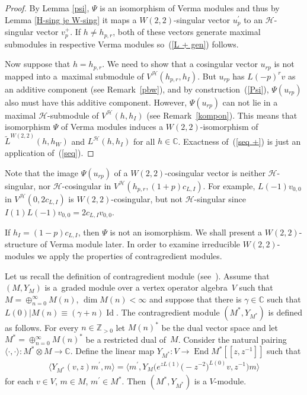 \documentclass[11pt]{article}
\numberwithin{equation}{section}
\newcommand{\N}{{\mathbb Z}_{> 0} }
\newcommand{\C}{\mathbb C}
\newcommand{\HVir}{\mathcal H}
\begin{document}
\begin{proof}
By Lemma \ref{psi}, $\Psi$ is an isomorphism of Verma modules and thus by Lemma \ref{H-sing je W-sing} it maps a $W(2,2) $-singular vector $u^{\prime}_p$ to an $\HVir$-singular vector $v_p^+$. If $h\neq h_{p,r}$, both of these vectors generate maximal submodules in respective Verma modules so~(\ref{L + gen}) follows.

Now suppose that $h=h_{p,r}$. We need to show that a cosingular vector $u_{rp}$ is not mapped into a~maximal submodule of $V^\HVir(h_{p,r},h_I)$. But $u_{rp}$ has $L(-p) ^{r}v$ as an additive component (see Remark~\ref{pbw}), and by construction~(\ref{Psi}), $\Psi(u_{rp})$ also must have this additive component. However, $\Psi(u_{rp})$ can not lie in a maximal $\HVir$-submodule of $V^{\HVir}(h,h_{I}) $ (see Remark~\ref{kompon}). This means that isomorphism $\Psi$ of Verma modules induces a $W(2,2) $-isomorphism of $\widetilde{L}^{W(2,2)}(h,h_{W}) $ and $L^{\HVir}(h,h_{I}) $ for all $h\in\C$. Exactness of~(\ref{seq +}) is just an application of~(\ref{seq}).
\end{proof}

\begin{Remark}
Note that the image $\Psi(u_{rp}) $ of a $W(2,2)$-cosingular vector is neither $\HVir$-singular, nor $\HVir$-cosingular in $V^{\HVir}(h_{p,r},(1+p)c_{L,I})$. For example, $L(-1) v_{0,0}$ in $V^{\HVir}(0,2c_{L,I})$ is $W(2,2)$-cosingular, but not $\HVir$-singular since $I(1) L(-1) v_{0,0}=2c_{L,I}v_{0,0}$.
\end{Remark}

If $h_{I}=(1-p) c_{L,I}$, then $\Psi $ is not an isomorphism. We shall present a $W(2,2)$-structure of Verma module later. In order to examine irreducible $W(2,2)$-modules we apply the properties of contragredient modules.

Let us recall the def\/inition of contragredient module (see~\cite{FHL}). Assume that $(M,Y_{M})$ is a~graded module over a vertex operator algebra~$V$ such that $M=\oplus _{n=0}^{\infty }M(n)$, $\dim M(n)<\infty $ and suppose that there is $\gamma \in {\C}$ such that $L(0)|M(n)\equiv (\gamma +n)\operatorname{Id}$. The contragredient module $( M^{\ast },Y_{M^{\ast}}) $ is def\/ined as follows. For every $n\in {\N}$ let $M(n)^{\ast }$ be the dual vector space and let $M^{\ast }=\oplus _{n=0}^{\infty }M(n)^{\ast }$ be a restricted dual of~$M$. Consider the natural pairing $\langle \cdot ,\cdot \rangle :M^{\ast }\otimes M\rightarrow \C$. Def\/ine the linear map $Y_{M^{\ast }}\colon V\rightarrow \operatorname{End} M^{\ast }[[z,z^{-1}]]$ such that
\begin{gather}
\langle Y_{M^{\ast }}(v,z)m^{\prime },m\rangle =\big\langle m^{\prime },Y_{M}\big(e^{zL(1)}\big({-}z^{-2}\big)^{L(0)}v,z^{-1}\big)m\big\rangle \label{contra}
\end{gather}
for each $v\in V$, $m\in M$, $m^{\prime }\in M^{\ast }$. Then $(M^{\ast },Y_{M^{\ast }}) $ is a $V$-module.
\end{document}
